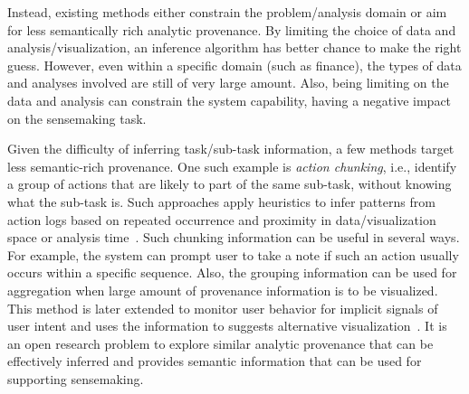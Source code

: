 Instead, existing methods either constrain the problem/analysis domain or aim for less semantically rich analytic provenance. By limiting the choice of data and analysis/visualization, an inference algorithm has better chance to make the right guess. However, even within a specific domain (such as finance), the types of data and analyses involved are still of very large amount. Also, being limiting on the data and analysis can constrain the system capability, having a negative impact on the sensemaking task.

Given the difficulty of inferring task/sub-task information, a few methods target less semantic-rich provenance. One such example is \emph{action chunking}, i.e., identify a group of actions that are likely to part of the same sub-task, without knowing what the sub-task is. Such approaches apply heuristics to infer patterns from action logs based on repeated occurrence and proximity in data/visualization space or analysis time~\cite{Gotz2009}. Such chunking information can be useful in several ways. For example, the system can prompt user to take a note if such an action usually occurs within a specific sequence. Also, the grouping information can be used for aggregation when large amount of provenance information is to be visualized. This method is later extended to monitor user behavior for implicit signals of user intent and uses the information to suggests alternative visualization~\cite{Gotz2009}. It is an open research problem to explore similar analytic provenance that can be effectively inferred and provides semantic information that can be used for supporting sensemaking.